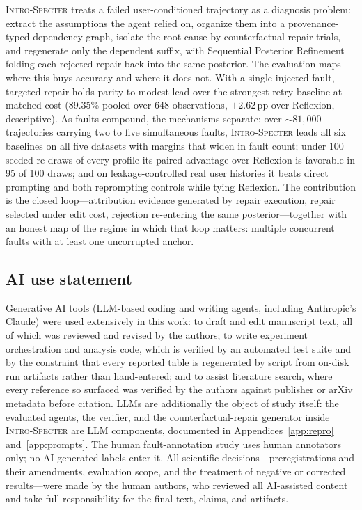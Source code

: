 \documentclass{article}
\newcommand{\method}{\textsc{Intro-Specter}\xspace}
\begin{document}
\method treats a failed user-conditioned trajectory as a diagnosis problem: extract the assumptions the agent relied on, organize them into a provenance-typed dependency graph, isolate the root cause by counterfactual repair trials, and regenerate only the dependent suffix, with Sequential Posterior Refinement folding each rejected repair back into the same posterior. The evaluation maps where this buys accuracy and where it does not. With a single injected fault, targeted repair holds parity-to-modest-lead over the strongest retry baseline at matched cost (89.35\% pooled over 648 observations, $+2.62$\,pp over Reflexion, descriptive). As faults compound, the mechanisms separate: over ${\sim}81{,}000$ trajectories carrying two to five simultaneous faults, \method leads all six baselines on all five datasets with margins that widen in fault count; under 100 seeded re-draws of every profile its paired advantage over Reflexion is favorable in 95 of 100 draws; and on leakage-controlled real user histories it beats direct prompting and both reprompting controls while tying Reflexion. The contribution is the closed loop---attribution evidence generated by repair execution, repair selected under edit cost, rejection re-entering the same posterior---together with an honest map of the regime in which that loop matters: multiple concurrent faults with at least one uncorrupted anchor.

\subsection*{AI use statement}

Generative AI tools (LLM-based coding and writing agents, including Anthropic's Claude) were used extensively in this work: to draft and edit manuscript text, all of which was reviewed and revised by the authors; to write experiment orchestration and analysis code, which is verified by an automated test suite and by the constraint that every reported table is regenerated by script from on-disk run artifacts rather than hand-entered; and to assist literature search, where every reference so surfaced was verified by the authors against publisher or arXiv metadata before citation. LLMs are additionally the object of study itself: the evaluated agents, the verifier, and the counterfactual-repair generator inside \method are LLM components, documented in Appendices~\ref{app:repro} and~\ref{app:prompts}. The human fault-annotation study uses human annotators only; no AI-generated labels enter it. All scientific decisions---preregistrations and their amendments, evaluation scope, and the treatment of negative or corrected results---were made by the human authors, who reviewed all AI-assisted content and take full responsibility for the final text, claims, and artifacts.
\end{document}
